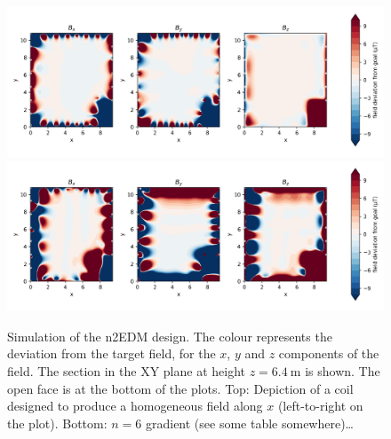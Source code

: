 \begin{figure}
  \centering
  \includegraphics[width=\linewidth]{gfx/prototype/n2EDM_field_Xcoil_XY_z6_4.png}
  \includegraphics[width=\linewidth]{gfx/prototype/n2EDM_field_n6coil_XY_z6_4.png}
  \caption{Simulation of the n2EDM design.
  The colour represents the deviation from the target field, for the $x$, $y$ and $z$ components of the field.
  The section in the XY plane at height $z=\SI{6.4}{\meter}$ is shown.
  The open face is at the bottom of the plots.
  Top: Depiction of a coil designed to produce a homogeneous field along $x$ (left-to-right on the plot).
  Bottom: $n=6$ gradient (see some table somewhere)\ldots {}}\label{fig:n2EDM_design_fields}
\end{figure}

